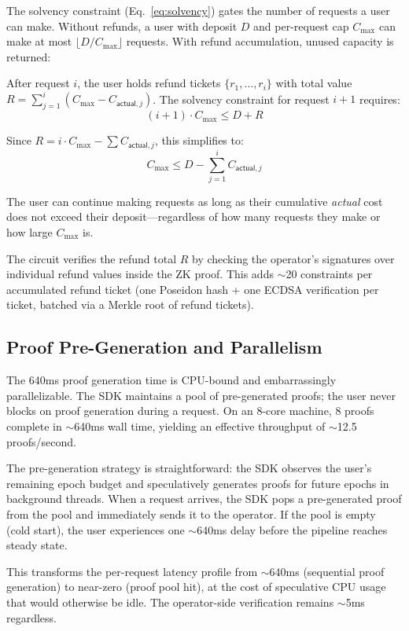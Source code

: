\documentclass[11pt,a4paper]{article}
\theoremstyle{definition}
\begin{document}
The solvency constraint (Eq.~\ref{eq:solvency}) gates the number of requests a user can make. Without refunds, a user with deposit $D$ and per-request cap $C_{\max}$ can make at most $\lfloor D / C_{\max} \rfloor$ requests. With refund accumulation, unused capacity is returned:

After request $i$, the user holds refund tickets $\{r_1, \ldots, r_i\}$ with total value $R = \sum_{j=1}^{i} (C_{\max} - C_{\mathsf{actual},j})$. The solvency constraint for request $i+1$ requires:
$$(i+1) \cdot C_{\max} \leq D + R$$

Since $R = i \cdot C_{\max} - \sum C_{\mathsf{actual},j}$, this simplifies to:
$$C_{\max} \leq D - \sum_{j=1}^{i} C_{\mathsf{actual},j}$$

The user can continue making requests as long as their cumulative \emph{actual} cost does not exceed their deposit---regardless of how many requests they make or how large $C_{\max}$ is.

The circuit verifies the refund total $R$ by checking the operator's signatures over individual refund values inside the ZK proof. This adds $\sim$20 constraints per accumulated refund ticket (one Poseidon hash + one ECDSA verification per ticket, batched via a Merkle root of refund tickets).

\subsection{Proof Pre-Generation and Parallelism}

The 640ms proof generation time is CPU-bound and embarrassingly parallelizable. The SDK maintains a pool of pre-generated proofs; the user never blocks on proof generation during a request. On an 8-core machine, 8 proofs complete in $\sim$640ms wall time, yielding an effective throughput of $\sim$12.5 proofs/second.

The pre-generation strategy is straightforward: the SDK observes the user's remaining epoch budget and speculatively generates proofs for future epochs in background threads. When a request arrives, the SDK pops a pre-generated proof from the pool and immediately sends it to the operator. If the pool is empty (cold start), the user experiences one $\sim$640ms delay before the pipeline reaches steady state.

This transforms the per-request latency profile from $\sim$640ms (sequential proof generation) to near-zero (proof pool hit), at the cost of speculative CPU usage that would otherwise be idle. The operator-side verification remains $\sim$5ms regardless.
\end{document}

